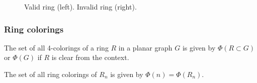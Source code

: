 \begin{frame}
\begin{figure}[!ht]
        \caption{Valid ring (left). Invalid ring (right).}
        \label{fig:ring}
    \end{figure}
\end{frame}


\begin{frame}
    \frametitle{Ring colorings}

    \begin{definition}
        The set of all 4-colorings of a ring $R$ in a planar graph $G$ is given by $\Phi(R \subset G)$ or $\Phi(G)$ if $R$ is clear from the context.
    \end{definition}
    \begin{definition}
        The set of all ring colorings of $R_n$ is given by $\Phi(n) = \Phi(R_n)$.
    \end{definition}
\end{frame}


